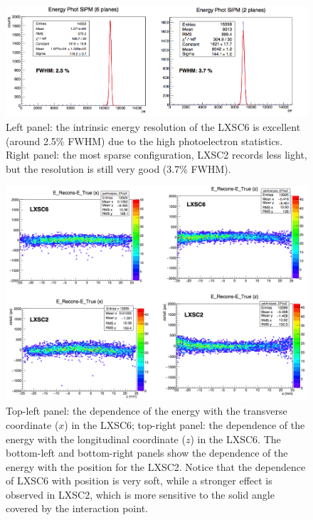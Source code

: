 \documentclass{JINST}
\begin{document}
\begin{figure}[!htb]
	\centering
	\includegraphics[scale=0.5]{img/energyResolution.png}
	\caption{\label{fig.energy}  Left panel: the intrinsic energy resolution of the LXSC6 is excellent (around 2.5\% FWHM) due to the high photoelectron statistics. Right panel: the most sparse configuration, LXSC2 records less light, but the resolution is still very good (3.7\% FWHM). }
\end{figure}

\begin{figure}[!htb]
	\centering
	\includegraphics[scale=0.5]{img/EnergyPos.png}
	\caption{\label{fig.energyDep}  Top-left panel: the dependence of the energy with the transverse coordinate ($x$) in the LXSC6; top-right panel: the dependence of the energy with the longitudinal coordinate ($z$) in the LXSC6. The bottom-left and bottom-right panels show the dependence of the energy with the position for the LXSC2. Notice that the dependence of LXSC6 with position is very soft, while a stronger effect is observed in LXSC2, which is more sensitive to the solid angle covered by the interaction point.}
\end{figure}
\end{document}
